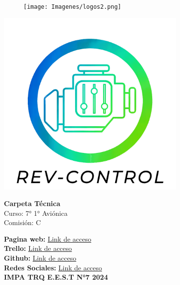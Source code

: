 \documentclass[a4paper,12pt]{report}
\begin{document}
\begin{titlepage}
    \centering
    \begin{figure}
        \centering
        \texttt{[image: Imagenes/logos2.png]} %
    \end{figure}
    
    \includegraphics[width=0.7\textwidth]{Imagenes/LOGO REV CONTROL OFICIAL.png} 
    \vspace{1cm}
    
    {\Huge \textbf{\textcolor{Celeste}{Carpeta Técnica}\\}}
    \vspace{1cm}
    {\Large Curso: 7° 1° Aviónica\\}
    \vspace{0.5cm}
    {\Large Comisión: C}
    \vspace{1cm}

    \textbf{Pagina web:} \href{https://www.google.com/}{Link de acceso}\\
    \textbf{Trello:} \href{https://trello.com/b/yDSPDlAp/kanban}{Link de acceso}\\
    \textbf{Github:} \href{https://github.com/impatrq/revcontrol}{Link de acceso}\\
    \textbf{Redes Sociales:} \href{https://www.instagram.com/rev.control/}{Link de acceso} \\
    \vfill
    \textbf{IMPA TRQ E.E.S.T N°7 2024}
\end{titlepage}

\tableofcontents
\newpage
\end{document}
